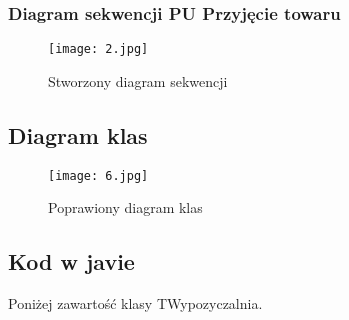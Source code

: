 \documentclass{article}
\begin{document}
\subsubsection{Diagram sekwencji PU Przyjęcie towaru}
\begin{figure}[!ht]
	\centering
	\texttt{[image: 2.jpg]}
	\caption{Stworzony diagram sekwencji}
	\label{fig:obrazek 5}
\end{figure}
\subsection{Diagram klas}
\begin{figure}[!ht]
	\centering
	\texttt{[image: 6.jpg]}
	\caption{Poprawiony diagram klas
	}
	\label{fig:obrazek 6}
\end{figure}
\newpage
\subsection{Kod w javie}
Poniżej zawartość klasy TWypozyczalnia.
\end{document}
